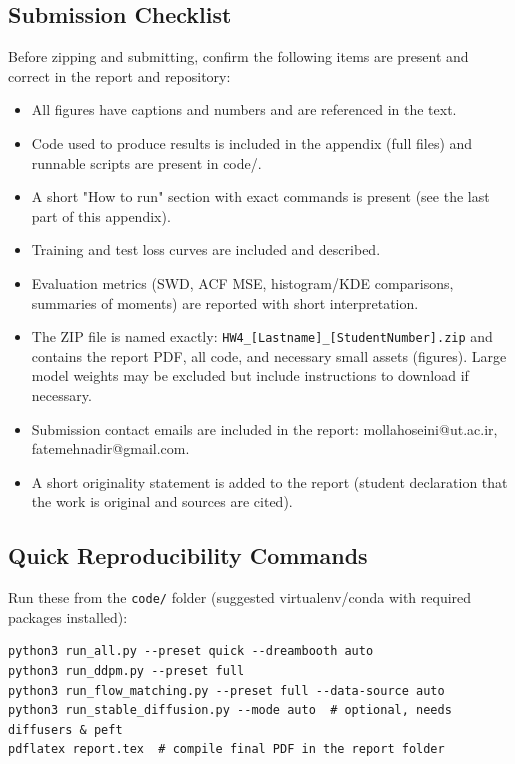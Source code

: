 \documentclass[a4paper,12pt]{article}
\begin{document}
\subsection{Submission Checklist}
Before zipping and submitting, confirm the following items are present and correct in the report and repository:
\begin{itemize}
    \item All figures have captions and numbers and are referenced in the text.
    \item Code used to produce results is included in the appendix (full files) and runnable scripts are present in code/.
    \item A short "How to run" section with exact commands is present (see the last part of this appendix).
    \item Training and test loss curves are included and described.
    \item Evaluation metrics (SWD, ACF MSE, histogram/KDE comparisons, summaries of moments) are reported with short interpretation.
    \item The ZIP file is named exactly: \texttt{HW4\_[Lastname]\_[StudentNumber].zip} and contains the report PDF, all code, and necessary small assets (figures). Large model weights may be excluded but include instructions to download if necessary.
    \item Submission contact emails are included in the report: mollahoseini@ut.ac.ir, fatemehnadir@gmail.com.
    \item A short originality statement is added to the report (student declaration that the work is original and sources are cited).
\end{itemize}

\subsection{Quick Reproducibility Commands}
Run these from the \texttt{code/} folder (suggested virtualenv/conda with required packages installed):
\begin{verbatim}
python3 run_all.py --preset quick --dreambooth auto
python3 run_ddpm.py --preset full
python3 run_flow_matching.py --preset full --data-source auto
python3 run_stable_diffusion.py --mode auto  # optional, needs diffusers & peft
pdflatex report.tex  # compile final PDF in the report folder
\end{verbatim}
\end{document}
